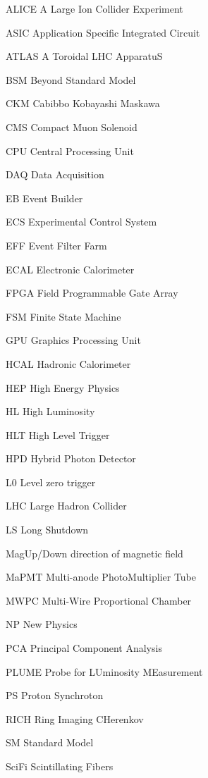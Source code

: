 \begin{abbreviations}
    \item[ALICE] A Large Ion Collider Experiment
    \item[ASIC] Application Specific Integrated Circuit
    \item[ATLAS] A Toroidal LHC ApparatuS
    \item[BSM] Beyond Standard Model
    \item[CKM] Cabibbo Kobayashi Maskawa
    \item[CMS] Compact Muon Solenoid
    \item[CPU] Central Processing Unit
    \item[DAQ] Data Acquisition
    \item[EB] Event Builder
    \item[ECS] Experimental Control System
    \item[EFF] Event Filter Farm
    \item[ECAL] Electronic Calorimeter
    \item[FPGA] Field Programmable Gate Array
    \item[FSM] Finite State Machine
    \item[GPU] Graphics Processing Unit
    \item[HCAL] Hadronic Calorimeter
    \item[HEP] High Energy Physics
    \item[HL] High Luminosity
    \item[HLT] High Level Trigger
    \item[HPD] Hybrid Photon Detector
    \item[L0] Level zero trigger
    \item[LHC] Large Hadron Collider
    \item[LS] Long Shutdown
    \item[MagUp/Down] direction of magnetic field
    \item[MaPMT] Multi-anode PhotoMultiplier Tube
    \item[MWPC] Multi-Wire Proportional Chamber
    \item[NP] New Physics
    \item[PCA] Principal Component Analysis
    \item[PLUME] Probe for LUminosity MEasurement
    \item[PS] Proton Synchroton
    \item[RICH] Ring Imaging CHerenkov
    \item[SM] Standard Model
    \item[SciFi] Scintillating Fibers

\end{abbreviations}
